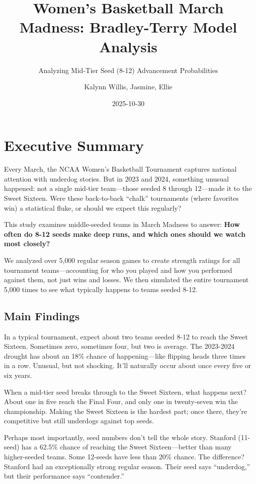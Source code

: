\documentclass[
]{article}
\title{Women's Basketball March Madness: Bradley-Terry Model Analysis}
\subtitle{Analyzing Mid-Tier Seed (8-12) Advancement Probabilities}
\author{Kalynn Willis, Jasmine, Ellie}
\date{2025-10-30}
\begin{document}
\maketitle

{
\setcounter{tocdepth}{3}
\tableofcontents
}
\section*{Executive Summary}\label{executive-summary}

Every March, the NCAA Women's Basketball Tournament captures national
attention with underdog stories. But in 2023 and 2024, something unusual
happened: not a single mid-tier team---those seeded 8 through 12---made
it to the Sweet Sixteen. Were these back-to-back ``chalk'' tournaments
(where favorites win) a statistical fluke, or should we expect this
regularly?

This study examines middle-seeded teams in March Madness to answer:
\textbf{How often do 8-12 seeds make deep runs, and which ones should we
watch most closely?}

We analyzed over 5,000 regular season games to create strength ratings
for all tournament teams---accounting for who you played and how you
performed against them, not just wins and losses. We then simulated the
entire tournament 5,000 times to see what typically happens to teams
seeded 8-12.

\subsection{Main Findings}\label{main-findings}

In a typical tournament, expect about two teams seeded 8-12 to reach the
Sweet Sixteen. Sometimes zero, sometimes four, but two is average. The
2023-2024 drought has about an 18\% chance of happening---like flipping
heads three times in a row. Unusual, but not shocking. It'll naturally
occur about once every five or six years.

When a mid-tier seed breaks through to the Sweet Sixteen, what happens
next? About one in five reach the Final Four, and only one in
twenty-seven win the championship. Making the Sweet Sixteen is the
hardest part; once there, they're competitive but still underdogs
against top seeds.

Perhaps most importantly, seed numbers don't tell the whole story.
Stanford (11-seed) has a 62.5\% chance of reaching the Sweet
Sixteen---better than many higher-seeded teams. Some 12-seeds have less
than 20\% chance. The difference? Stanford had an exceptionally strong
regular season. Their seed says ``underdog,'' but their performance says
``contender.''
\end{document}
